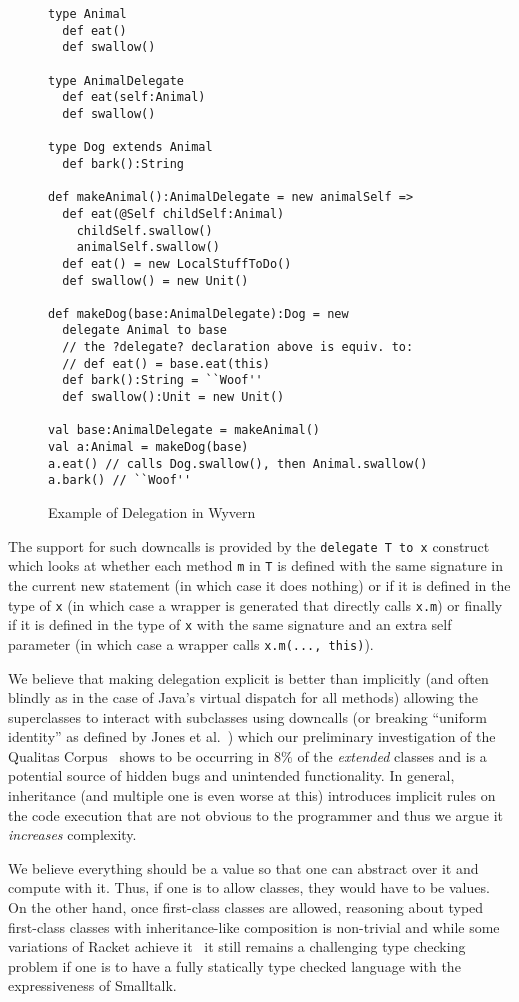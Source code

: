 \documentclass[preprint]{sigplanconf}
\begin{document}
\begin{figure}
\begin{lstlisting}
type Animal
  def eat()
  def swallow()

type AnimalDelegate
  def eat(self:Animal)
  def swallow()

type Dog extends Animal
  def bark():String

def makeAnimal():AnimalDelegate = new animalSelf =>
  def eat(@Self childSelf:Animal)
    childSelf.swallow()
    animalSelf.swallow()
  def eat() = new LocalStuffToDo()
  def swallow() = new Unit()

def makeDog(base:AnimalDelegate):Dog = new
  delegate Animal to base
  // the ?delegate? declaration above is equiv. to:
  // def eat() = base.eat(this)
  def bark():String = ``Woof''
  def swallow():Unit = new Unit()

val base:AnimalDelegate = makeAnimal()
val a:Animal = makeDog(base)
a.eat() // calls Dog.swallow(), then Animal.swallow()
a.bark() // ``Woof''
\end{lstlisting}
\caption{Example of Delegation in Wyvern}
\label{f:wyvern-delegation}
\end{figure}

The support for such downcalls is provided by the \texttt{delegate T to x} construct which looks at whether each method \texttt{m} in \texttt{T} is defined with the same signature in the current new statement (in which case it does nothing) or if it is defined in the type of \texttt{x} (in which case a wrapper is generated that directly calls \texttt{x.m}) or finally if it is defined in the type of \texttt{x} with the same signature and an extra self parameter (in which case a wrapper calls \texttt{x.m(..., this)}).

We believe that making delegation explicit is better than implicitly (and often blindly as in the case of Java's virtual dispatch for all methods) allowing the superclasses to interact with subclasses using downcalls (or breaking ``uniform identity'' as defined by Jones et al.~\cite{jones:2016:inheritance}) which our preliminary investigation of the Qualitas Corpus~\cite{QualitasCorpus:APSEC:2010} shows to be occurring in $8\%$ of the \textit{extended} classes and is a potential source of hidden bugs and unintended functionality. In general, inheritance (and multiple one is even worse at this) introduces implicit rules on the code execution that are not obvious to the programmer and thus we argue it \textit{increases} complexity.

We believe everything should be a value so that one can abstract over it and compute with it. Thus, if one is to allow classes, they would have to be values. On the other hand, once first-class classes are allowed, reasoning about typed first-class classes with inheritance-like composition is non-trivial and while some variations of Racket achieve it~\cite{Takikawa:2012:GTF:2384616.2384674} it still remains a challenging type checking problem if one is to have a fully statically type checked language with the expressiveness of Smalltalk.
\end{document}
